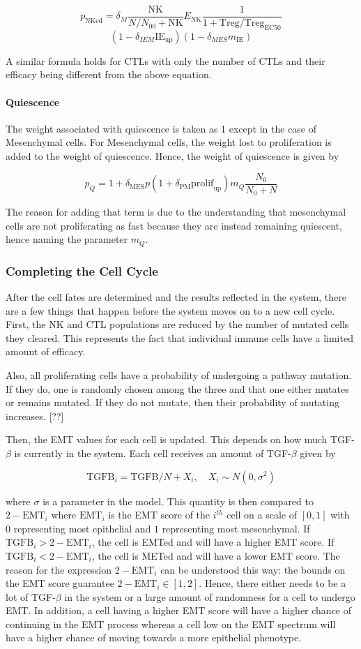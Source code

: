 \documentclass{article}
\begin{document}
$$ p_{\text{NKed}} =  \delta_M \frac{\text{NK}}{N/N_{00}+\text{NK}} E_{\text{NK}} \frac{1}{1+\text{Treg}/\text{Treg}_{\text{EC50}}} $$ $$ (1-\delta_{IEM}\text{IE}_{\text{up}})(1-\delta_{MES}m_{\text{IE}})$$

A similar formula holds for CTLs with only the number of CTLs and their efficacy being different from the above equation.


\paragraph{Quiescence}
The weight associated with quiescence is taken as 1 except in the case of Mesenchymal cells.
For Mesenchymal cells, the weight lost to proliferation is added to the weight of quiescence.
Hence, the weight of quiescence is given by

$$ p_Q = 1 + \delta_{\text{MES}}p(1+\delta_{\text{PM}}\text{prolif}_{\text{up}})m_Q\frac{N_0}{N_0+N} $$

The reason for adding that term is due to the understanding that mesenchymal cells are not proliferating as fast because they are instead remaining quiescent, hence naming the parameter $m_Q$.

\subsubsection{Completing the Cell Cycle}
After the cell fates are determined and the results reflected in the system, there are a few things that happen before the system moves on to a new cell cycle.
First, the NK and CTL populations are reduced by the number of mutated cells they cleared.
This represents the fact that individual immune cells have a limited amount of efficacy.

Also, all proliferating cells have a probability of undergoing a pathway mutation.
If they do, one is randomly chosen among the three and that one either mutates or remains mutated.
If they do not mutate, then their probability of mutating increases. [??]

Then, the EMT values for each cell is updated.
This depends on how much TGF-$\beta$ is currently in the system.
Each cell receives an amount of TGF-$\beta$ given by

$$ \text{TGFB}_i = \text{TGFB}/N + X_i, \quad X_i \sim N(0,\sigma^2)  $$

where $\sigma$ is a parameter in the model.
This quantity is then compared to $2-\text{EMT}_i$ where $\text{EMT}_i$ is the EMT score of the $i^{th}$ cell on a scale of $[0,1]$ with $0$ representing most epithelial and $1$ representing most mesenchymal.
If $\text{TGFB}_i>2-\text{EMT}_i$, the cell is EMTed and will have a higher EMT score.
If $\text{TGFB}_i<2-\text{EMT}_i$, the cell is METed and will have a lower EMT score.
The reason for the expression $2-\text{EMT}_i$ can be understood this way: 
the bounds on the EMT score guarantee $2-\text{EMT}_i\in[1,2]$.
Hence, there either needs to be a lot of TGF-$\beta$ in the system or a large amount of randomness for a cell to undergo EMT.
In addition, a cell having a higher EMT score will have a higher chance of continuing in the EMT process whereas a cell low on the EMT spectrum will have a higher chance of moving towards a more epithelial phenotype.
\end{document}
